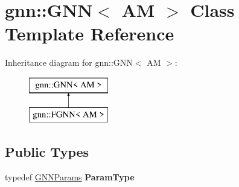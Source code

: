 \hypertarget{classgnn_1_1GNN}{\section{gnn\-:\-:G\-N\-N$<$ A\-M $>$ Class Template Reference}
\label{classgnn_1_1GNN}
}
Inheritance diagram for gnn\-:\-:G\-N\-N$<$ A\-M $>$\-:\begin{figure}[H]
\begin{center}
\leavevmode
\includegraphics[height=2.000000cm]{classgnn_1_1GNN}
\end{center}
\end{figure}
\subsection*{Public Types}
\begin{DoxyCompactItemize}
\item 
\hypertarget{classgnn_1_1GNN_a45509461044fc7a8c2c9e8f1541b354d}{typedef \hyperlink{structgnn_1_1GNNParams}{G\-N\-N\-Params} {\bfseries Param\-Type}}\label{classgnn_1_1GNN_a45509461044fc7a8c2c9e8f1541b354d}

\end{DoxyCompactItemize}
